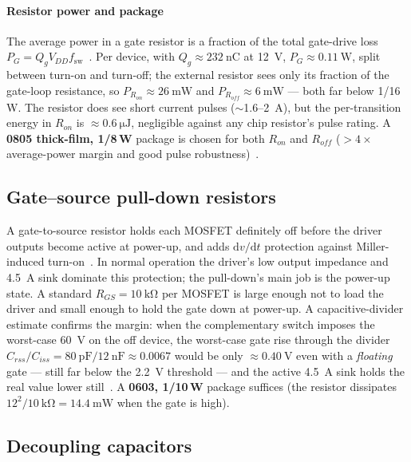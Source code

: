 \documentclass[journal,onecolumn,11pt]{IEEEtran}
\newcommand{\fsw}{f_{\mathrm{sw}}}
\begin{document}
\paragraph{Resistor power and package}
The average power in a gate resistor is a fraction of the total gate-drive loss
$P_G=Q_g V_{DD}\fsw$~\cite{balogh}. Per device, with $Q_g\approx\SI{232}{\nano\coulomb}$ at
\SI{12}{\volt}, $P_G\approx\SI{0.11}{\watt}$, split between turn-on and turn-off; the external
resistor sees only its fraction of the gate-loop resistance, so $P_{R_{on}}\approx\SI{26}{\milli\watt}$
and $P_{R_{off}}\approx\SI{6}{\milli\watt}$ --- both far below 1/16\,W. The resistor does see
short current pulses ($\sim$1.6--\SI{2}{\ampere}), but the per-transition energy in $R_{on}$ is
$\approx\SI{0.6}{\micro\joule}$, negligible against any chip resistor's pulse rating. A
\textbf{0805 thick-film, 1/8\,W} package is chosen for both $R_{on}$ and $R_{off}$
($>4\times$ average-power margin and good pulse robustness)~\cite{balogh}.

\subsection{Gate--source pull-down resistors}\label{sec:pulldown}
A gate-to-source resistor holds each MOSFET definitely off before the driver outputs become active
at power-up, and adds $\mathrm{d}v/\mathrm{d}t$ protection against Miller-induced
turn-on~\cite{balogh}. In normal operation the driver's low output impedance and \SI{4.5}{\ampere}
sink dominate this protection; the pull-down's main job is the power-up state. A standard
$\boxed{R_{GS}=\SI{10}{\kilo\ohm}}$ per MOSFET is large enough not to load the driver and small
enough to hold the gate down at power-up. A capacitive-divider estimate confirms the margin: when
the complementary switch imposes the worst-case \SI{60}{\volt} on the off device, the worst-case
gate rise through the divider $C_{rss}/C_{iss}=\SI{80}{\pico\farad}/\SI{12}{\nano\farad}\approx0.0067$
would be only $\approx\SI{0.40}{\volt}$ even with a \emph{floating} gate --- still far below the
\SI{2.2}{\volt} threshold --- and the active \SI{4.5}{\ampere} sink holds the real value lower
still~\cite{ipt015ds,ucc27211}. A \textbf{0603, 1/10\,W} package suffices (the resistor
dissipates $12^2/\SI{10}{\kilo\ohm}=\SI{14.4}{\milli\watt}$ when the gate is high).

\subsection{Decoupling capacitors}
\end{document}
